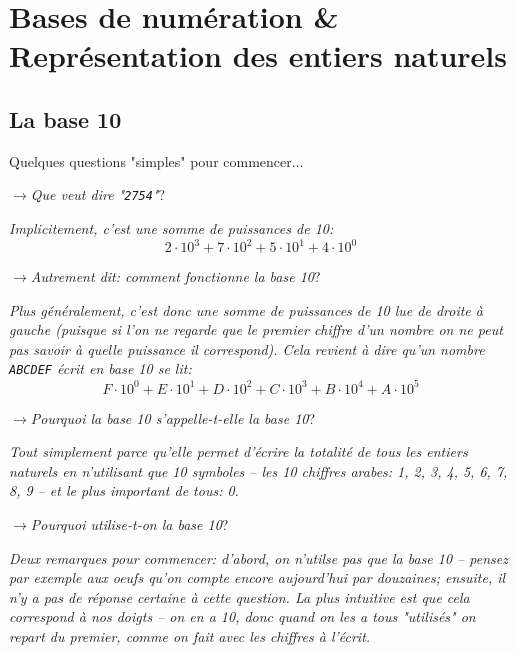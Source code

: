 \documentclass[12pt]{article}
\newcommand{\MaQuestion}[1]{\par\vspace{0.3\baselineskip}\noindent$\rightarrow$\textit{#1}?\par\vspace{0.3\baselineskip}}
\newenvironment{MaReponse}
		{\begin{greyedtextbox}\itshape} %
		{\end{greyedtextbox}}            %
\begin{document}
	 \pagebreak
	 
	 \section{Bases de numération \& Représentation des entiers naturels}
	 
	 
	 \subsection{La base 10}
	 
	 Quelques questions "simples" pour commencer...
	 \MaQuestion{Que veut dire "\texttt{2754}"}
\begin{MaReponse}
	Implicitement, c'est une somme de puissances de 10: \[ 2 \cdot 10^3 + 7 \cdot 10^2 + 5 \cdot 10^1 + 4 \cdot 10^0 \]
\end{MaReponse}
	 
	 \MaQuestion{Autrement dit: comment fonctionne la base 10}
\begin{MaReponse}
	Plus généralement, c'est donc une somme de puissances de 10 lue de droite à gauche (puisque si l'on ne regarde que le premier chiffre d'un nombre on ne peut pas savoir à quelle puissance il correspond). Cela revient à dire qu'un nombre \texttt{ABCDEF} écrit en base 10 se lit: \[ F \cdot 10^0 + E \cdot 10^1 + D \cdot 10^2 + C \cdot 10^3 + B \cdot 10^4 + A \cdot 10^5\]
\end{MaReponse}

	 \MaQuestion{Pourquoi la base 10 s'appelle-t-elle la base 10}
\begin{MaReponse}
	Tout simplement parce qu'elle permet d'écrire la totalité de tous les entiers naturels en n'utilisant que 10 symboles -- les 10 chiffres arabes: 1, 2, 3, 4, 5, 6, 7, 8, 9 -- et le plus important de tous: 0.
\end{MaReponse}

	 \MaQuestion{Pourquoi utilise-t-on la base 10}
\begin{MaReponse}
	Deux remarques pour commencer: d'abord, on n'utilse pas que la base 10 -- pensez par exemple aux oeufs qu'on compte encore aujourd'hui par douzaines; ensuite, il n'y a pas de réponse certaine à cette question. La plus intuitive est que cela correspond à nos doigts -- on en a 10, donc quand on les a tous "utilisés" on repart du premier, comme on fait avec les chiffres à l'écrit.
\end{MaReponse}
\end{document}

